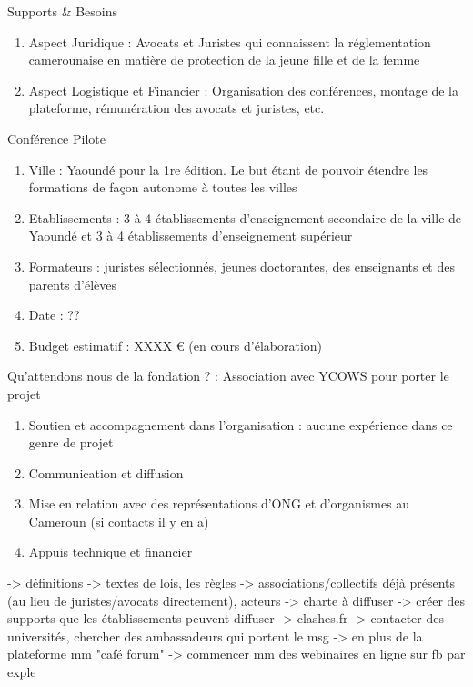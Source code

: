 \documentclass[aspectratio=169,xcolor=dvipsnames]{beamer}
\begin{document}
\begin{frame}{Supports \& Besoins}
    \begin{enumerate}
        \item Aspect Juridique : Avocats et Juristes qui connaissent la réglementation camerounaise en matière de protection de la jeune fille et de la femme
        \item Aspect Logistique et Financier : Organisation des conférences, montage de la plateforme, rémunération des avocats et juristes, etc.
    \end{enumerate}
\end{frame}
\begin{frame}{Conférence Pilote}
    \begin{enumerate}
        \item Ville : Yaoundé pour la 1re édition. Le but étant de pouvoir étendre les formations de façon autonome à toutes les villes
        \item Etablissements : 3 à 4 établissements d'enseignement secondaire de la ville de Yaoundé et 3 à 4 établissements d'enseignement supérieur
        \item Formateurs : juristes sélectionnés, jeunes doctorantes, des enseignants et des parents d'élèves
        \item Date : ??
        \item Budget estimatif : XXXX \euro{} (en cours d'élaboration)
    \end{enumerate}
\end{frame}
\begin{frame}{Qu'attendons nous de la fondation ? : Association avec YCOWS pour porter le projet}
    \begin{enumerate}
        \item Soutien et accompagnement dans l'organisation : aucune expérience dans ce genre de projet
        \item Communication et diffusion
        \item Mise en relation avec des représentations d'ONG et d'organismes au Cameroun (si contacts il y en a)
        \item Appuis technique et financier
    \end{enumerate}
\end{frame}
\begin{frame}
    \titlepage
\end{frame}
-> définitions
-> textes de lois, les règles
-> associations/collectifs déjà présents (au lieu de juristes/avocats directement), acteurs
-> charte à diffuser
-> créer des supports que les établissements peuvent diffuser
-> clashes.fr
-> contacter des universités, chercher des ambassadeurs qui portent le msg
-> en plus de la plateforme mm "café forum"
-> commencer mm des webinaires en ligne sur fb par exple
\end{document}
